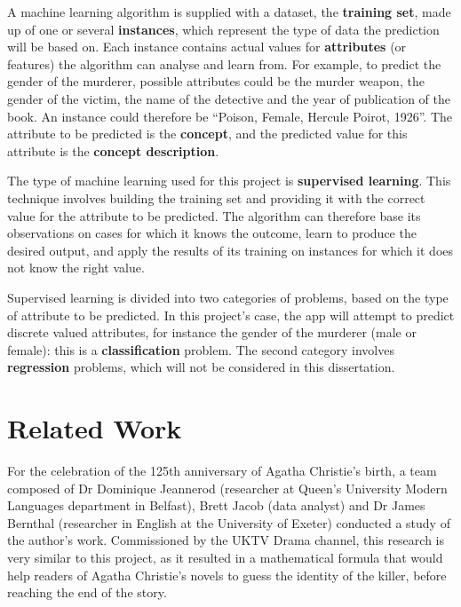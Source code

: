 \documentclass{mproj}
\begin{document}
A machine learning algorithm is supplied with a dataset, the \textbf{training set}, made up of one or several \textbf{instances}, which represent the type of data the prediction will be based on. Each instance contains actual values for \textbf{attributes} (or features) the algorithm can analyse and learn from. \cite[Chapter~2]{wekabook} For example, to predict the gender of the murderer, possible attributes could be the murder weapon, the gender of the victim, the name of the detective and the year of publication of the book. An instance could therefore be ``Poison, Female, Hercule Poirot, 1926''. The attribute to be predicted is the \textbf{concept}, and the predicted value for this attribute is the \textbf{concept description}. \par 

The type of machine learning used for this project is \textbf{supervised learning}. This technique involves building the training set and providing it with the correct value for the attribute to be predicted. \cite{machinelearningcourse} The algorithm can therefore base its observations on cases for which it knows the outcome, learn to produce the desired output, and apply the results of its training on instances for which it does not know the right value. \par

Supervised learning is divided into two categories of problems, based on the type of attribute to be predicted. In this project's case, the app will attempt to predict discrete valued attributes, for instance the gender of the murderer (male or female): this is a \textbf{classification} problem. The second category involves \textbf{regression} problems, which will not be considered in this dissertation.


\section{Related Work}

For the celebration of the 125th anniversary of Agatha Christie's birth, a team composed of Dr Dominique Jeannerod (researcher at Queen's University Modern Languages department in Belfast), Brett Jacob (data analyst) and Dr James Bernthal (researcher in English at the University of Exeter) conducted a study of the author's work. \cite{whodunnitbelfast} \cite{whodunnitguardian}
Commissioned by the UKTV Drama channel, this research is very similar to this project, as it resulted in a mathematical formula that would help readers of Agatha Christie's novels to guess the identity of the killer, before reaching the end of the story. \par
\end{document}
